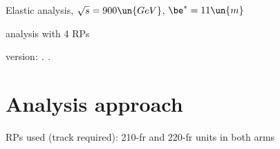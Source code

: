 

\def\baseDir{/afs/cern.ch/work/j/jkaspar/work/analyses/elastic/450GeV/beta11/4rp/}


\hbox{}
\vskip-10mm

\centerline{\SetFontSizesXX Elastic analysis, $\sqrt s = 900\un{GeV}$, $\be^* = 11\un{m}$}
\vskip2mm
\centerline{\SetFontSizesXX analysis with 4 RPs }
\vskip2mm
\centerline{version: {\it \number\day. \number\month. \number\year}}

\vfil
\InsertToc

\vfil
\eject

\BeginText

\chapter{Analysis approach}

\> RPs used (track required): 210-fr and 220-fr units in both arms






\EndText
\bye

